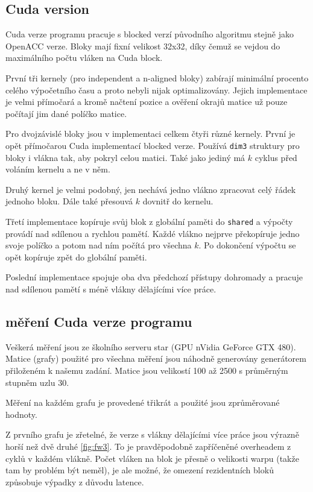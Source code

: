 \documentclass[11pt, fleqn]{article}
\begin{document}
\subsection{Cuda version}

Cuda verze programu pracuje s blocked verzí původního algoritmu stejně jako OpenACC verze. Bloky mají fixní velikost 32x32, díky čemuž se vejdou do maximálního počtu vláken na Cuda block.

První tři kernely (pro independent a n-aligned bloky) zabírají minimální procento celého výpočetního času a proto nebyli nijak optimalizovány. Jejich implementace je velmi přímočará a kromě načtení pozice a ověření okrajů matice už pouze počítají jim dané políčko matice.

Pro dvojzávislé bloky jsou v implementaci celkem čtyři různé kernely. První je opět přímočarou Cuda implementací blocked verze. Používá \lstinline{dim3} struktury pro bloky i vlákna tak, aby pokryl celou matici. Také jako jediný má $k$ cyklus před voláním kernelu a ne v něm.

Druhý kernel je velmi podobný, jen nechává jedno vlákno zpracovat celý řádek jednoho bloku. Dále také přesouvá $k$ dovnitř do kernelu.

Třetí implementace kopíruje svůj blok z globální paměti do \lstinline{shared} a výpočty provádí nad sdílenou a rychlou pamětí. Každé vlákno nejprve překopíruje jedno svoje políčko a potom nad ním počítá pro všechna $k$. Po dokončení výpočtu se opět kopíruje zpět do globální paměti.

Poslední implementace spojuje oba dva předchozí přístupy dohromady a pracuje nad sdílenou pamětí s méně vlákny dělajícími více práce.

\subsection{měření Cuda verze programu}

Veškerá měření jsou ze školního serveru star (GPU nVidia GeForce GTX 480). Matice (grafy) použité pro všechna měření jsou náhodně generovány generátorem přiloženém k našemu zadání. Matice jsou velikostí 100 až 2500 s průměrným stupněm uzlu 30.

Měření na každém grafu je provedené třikrát a použité jsou zprůměrované hodnoty.

Z prvního grafu je zřetelné, že verze s vlákny dělajícími více práce jsou výrazně horší než dvě druhé \ref{fig:fw3}. To je pravděpodobně zapříčeněné overheadem z cyklů v každém vlákně. Počet vláken na blok je přesně o velikosti warpu (takže tam by problém být neměl), je ale možné, že omezení rezidentních bloků způsobuje výpadky z důvodu latence.
\end{document}
